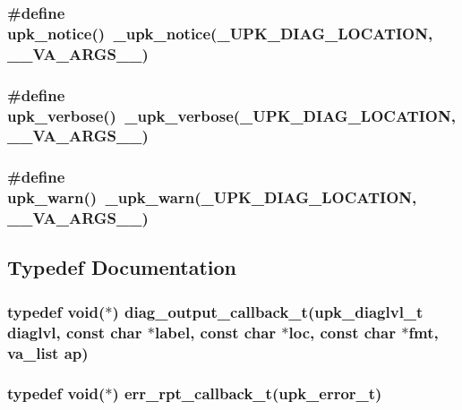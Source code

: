 \subsubsection{\setlength{\rightskip}{0pt plus 5cm}\#define upk\_\-notice()~\_\-upk\_\-notice(\_\-UPK\_\-DIAG\_\-LOCATION, \_\-\_\-VA\_\-ARGS\_\-\_\-)}\label{error_8h_83be2c568ce6d0942d2f483e3ca7cff6}


\subsubsection{\setlength{\rightskip}{0pt plus 5cm}\#define upk\_\-verbose()~\_\-upk\_\-verbose(\_\-UPK\_\-DIAG\_\-LOCATION, \_\-\_\-VA\_\-ARGS\_\-\_\-)}\label{error_8h_e47f0b840f32157a673f74343c9e1cac}


\subsubsection{\setlength{\rightskip}{0pt plus 5cm}\#define upk\_\-warn()~\_\-upk\_\-warn(\_\-UPK\_\-DIAG\_\-LOCATION, \_\-\_\-VA\_\-ARGS\_\-\_\-)}\label{error_8h_dbd2453bc884915622b41ed437982a4c}




\subsection{Typedef Documentation}
\subsubsection{\setlength{\rightskip}{0pt plus 5cm}typedef void($\ast$) \bf{diag\_\-output\_\-callback\_\-t}(\bf{upk\_\-diaglvl\_\-t} diaglvl, const char $\ast$label, const char $\ast$loc, const char $\ast$fmt, va\_\-list ap)}\label{error_8h_c8f4bb3c4ff49584ee62d2b3b69f10ea}


\subsubsection{\setlength{\rightskip}{0pt plus 5cm}typedef void($\ast$) \bf{err\_\-rpt\_\-callback\_\-t}(\bf{upk\_\-error\_\-t})}\label{error_8h_a3e07f1b7fe12e982ae41d5e733d0a20}


